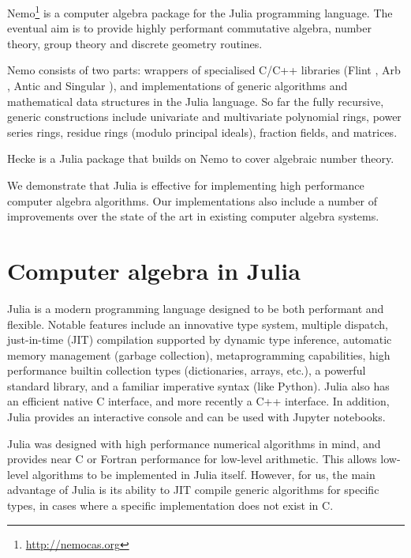 \documentclass{sig-alternate-05-2015}
\begin{document}
Nemo\footnote{\url{http://nemocas.org}} is a computer algebra package for the Julia programming language.
The eventual aim is
to provide highly performant commutative algebra, number theory, group theory and discrete
geometry routines.

Nemo consists of two parts: wrappers of specialised C/C++
libraries (Flint \cite{flint}, Arb \cite{arb}, Antic \cite{antic} and Singular
\cite{singular}), and
implementations of generic algorithms and mathematical data
structures in the Julia language. So far the fully recursive, generic constructions include
univariate and multivariate
polynomial rings, power series rings, residue rings (modulo principal ideals),
fraction fields, and matrices.

Hecke is a Julia package that builds on Nemo to cover algebraic number theory.

We demonstrate
that Julia is effective for implementing high performance computer
algebra algorithms. Our implementations also
include a number of
improvements over the state of the art
in existing computer algebra systems.


\section{Computer algebra in Julia}
\label{sect:domains}

Julia \cite{julia} is a modern programming language designed
to be both performant and flexible.
Notable features include an innovative type system,
multiple dispatch,
just-in-time (JIT) compilation
supported by dynamic type inference,
automatic memory management (garbage collection),
metaprogramming capabilities,
high performance builtin collection types (dictionaries, arrays, etc.),
a powerful standard library,
and a familiar imperative syntax (like Python).
Julia also has an efficient native C interface, and more recently a C++ interface.
In addition, Julia provides an interactive console and can be used with Jupyter notebooks.

Julia was designed with high performance numerical algorithms in mind, and provides near
C or Fortran performance for low-level arithmetic. This allows low-level algorithms to be
implemented in Julia itself. However, for us, the main advantage of Julia is its ability
to JIT compile generic algorithms for specific types, in cases where a specific
implementation does not exist in C.
 
\end{document}
